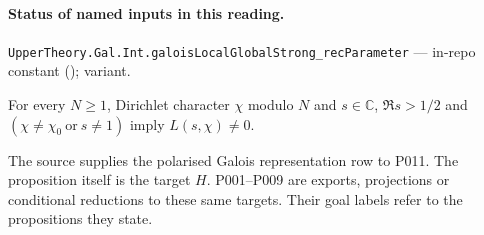 

\paragraph{Status of named inputs in this reading.}
\noindent\nolinkurl{UpperTheory.Gal.Int.galoisLocalGlobalStrong_recParameter} --- in-repo constant (); variant.\par

\begin{formalstatement}\label{pn:P010}
For every $N\ge1$, Dirichlet character $\chi$ modulo $N$ and $s\in\mathbb C$, $\Re s>1/2$ and $(\chi\ne\chi_0\ \text{or}\ s\ne1)$ imply $L(s,\chi)\ne0$.
\end{formalstatement}
The source supplies the polarised Galois representation row to P011. The proposition itself is the target $H$. P001--P009 are exports, projections or conditional reductions to these same targets. Their goal labels refer to the propositions they state.
